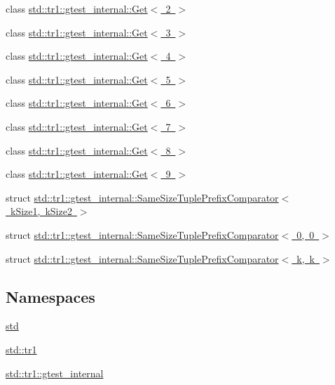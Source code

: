\begin{DoxyCompactItemize}
\item 
class \mbox{\hyperlink{classstd_1_1tr1_1_1gtest__internal_1_1_get_3_012_01_4}{std\+::tr1\+::gtest\+\_\+internal\+::\+Get$<$ 2 $>$}}
\item 
class \mbox{\hyperlink{classstd_1_1tr1_1_1gtest__internal_1_1_get_3_013_01_4}{std\+::tr1\+::gtest\+\_\+internal\+::\+Get$<$ 3 $>$}}
\item 
class \mbox{\hyperlink{classstd_1_1tr1_1_1gtest__internal_1_1_get_3_014_01_4}{std\+::tr1\+::gtest\+\_\+internal\+::\+Get$<$ 4 $>$}}
\item 
class \mbox{\hyperlink{classstd_1_1tr1_1_1gtest__internal_1_1_get_3_015_01_4}{std\+::tr1\+::gtest\+\_\+internal\+::\+Get$<$ 5 $>$}}
\item 
class \mbox{\hyperlink{classstd_1_1tr1_1_1gtest__internal_1_1_get_3_016_01_4}{std\+::tr1\+::gtest\+\_\+internal\+::\+Get$<$ 6 $>$}}
\item 
class \mbox{\hyperlink{classstd_1_1tr1_1_1gtest__internal_1_1_get_3_017_01_4}{std\+::tr1\+::gtest\+\_\+internal\+::\+Get$<$ 7 $>$}}
\item 
class \mbox{\hyperlink{classstd_1_1tr1_1_1gtest__internal_1_1_get_3_018_01_4}{std\+::tr1\+::gtest\+\_\+internal\+::\+Get$<$ 8 $>$}}
\item 
class \mbox{\hyperlink{classstd_1_1tr1_1_1gtest__internal_1_1_get_3_019_01_4}{std\+::tr1\+::gtest\+\_\+internal\+::\+Get$<$ 9 $>$}}
\item 
struct \mbox{\hyperlink{structstd_1_1tr1_1_1gtest__internal_1_1_same_size_tuple_prefix_comparator}{std\+::tr1\+::gtest\+\_\+internal\+::\+Same\+Size\+Tuple\+Prefix\+Comparator$<$ k\+Size1, k\+Size2 $>$}}
\item 
struct \mbox{\hyperlink{structstd_1_1tr1_1_1gtest__internal_1_1_same_size_tuple_prefix_comparator_3_010_00_010_01_4}{std\+::tr1\+::gtest\+\_\+internal\+::\+Same\+Size\+Tuple\+Prefix\+Comparator$<$ 0, 0 $>$}}
\item 
struct \mbox{\hyperlink{structstd_1_1tr1_1_1gtest__internal_1_1_same_size_tuple_prefix_comparator_3_01k_00_01k_01_4}{std\+::tr1\+::gtest\+\_\+internal\+::\+Same\+Size\+Tuple\+Prefix\+Comparator$<$ k, k $>$}}
\end{DoxyCompactItemize}
\subsection*{Namespaces}
\begin{DoxyCompactItemize}
\item 
 \mbox{\hyperlink{namespacestd}{std}}
\item 
 \mbox{\hyperlink{namespacestd_1_1tr1}{std\+::tr1}}
\item 
 \mbox{\hyperlink{namespacestd_1_1tr1_1_1gtest__internal}{std\+::tr1\+::gtest\+\_\+internal}}
\end{DoxyCompactItemize}
